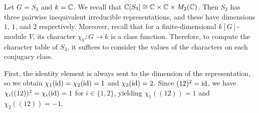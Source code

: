 \begin{exmp}{}
    Let $G = S_3$ and $k = \mathbb{C}$. We recall that $\mathbb{C}[S_3] \cong \mathbb{C} \times 
    \mathbb{C} \times M_2(\mathbb{C})$. Then $S_3$ has three pairwise inequivalent irreducible 
    representations, and these have dimensions $1$, $1$, and $2$ 
    respectively. Moreover, recall that for a finite-dimensional 
    $k[G]$-module $V$, its character $\chi_V : G \to k$ is a class function. 
    Therefore, to compute the character table of $S_3$, it suffices to 
    consider the values of the characters on each conjugacy class. 

    First, the identity element is always sent to the dimension of the 
    representation, so we obtain $\chi_1(\operatorname{id}) = \chi_2(\operatorname{id}) = 1$ and 
    $\chi_3(\operatorname{id}) = 2$. Since $(12)^2 = \operatorname{id}$, we have $\chi_i((12))^2 
    = \chi_i(\operatorname{id}) = 1$ for $i \in \{1, 2\}$, yielding 
    $\chi_1((12)) = 1$ and $\chi_2((12)) = -1$. 


\end{exmp}
